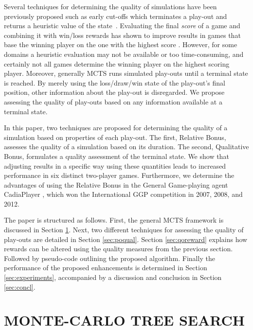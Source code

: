 \documentclass{ecai2014}
\begin{document}
Several techniques for determining the quality of simulations have been previously proposed such as early cut-offs which terminates a play-out and returns a heuristic value of the state~\cite{Winands2011}. Evaluating the final \emph{score} of a game and combining it with win/loss rewards has shown to improve results in games that base the winning player on the one with the highest score \cite{shibahara2008combining}. However, for some domains a heuristic evaluation may not be available or too time-consuming, and certainly not all games determine the winning player on the highest scoring player. Moreover, generally MCTS runs simulated play-outs until a terminal state is reached. By merely using the loss/draw/win state of the play-out's final position, other information about the play-out is disregarded. We propose assessing the quality of play-outs based on any information available at a terminal state.

In this paper, two techniques are proposed for determining the quality of a simulation based on properties of each play-out. The first, Relative Bonus, assesses the quality of a simulation based on its duration. The second, Qualitative Bonus, formulates a quality assessment of the terminal state. We show that adjusting results in a specific way using these quantities leads to increased performance in six distinct two-player games. Furthermore, we determine the advantages of using the Relative Bonus in the General Game-playing agent {\sc CadiaPlayer} \cite{bjornsson2009cadiaplayer}, which won the International GGP competition in 2007, 2008, and 2012.

The paper is structured as follows. First, the general MCTS framework is discussed in Section \ref{sec:mcts}. Next, two different techniques for assessing the quality of play-outs are detailed in Section \ref{sec:poqual}. Section \ref{sec:qoreward} explains how rewards can be altered using the quality measures from the previous section. Followed by pseudo-code outlining the proposed algorithm. Finally the performance of the proposed enhancements is determined in Section \ref{sec:experiments}, accompanied by a discussion and conclusion in Section \ref{sec:concl}.

\section{MONTE-CARLO TREE SEARCH}
\label{sec:mcts}
\end{document}
